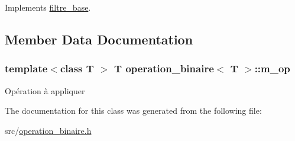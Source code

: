 Implements \hyperlink{classfiltre__base_ad06f5db1f851e5ad8655c9d8927cf347}{filtre\-\_\-base}.



\subsection{Member Data Documentation}
\hypertarget{classoperation__binaire_a7a8ee3b101f3fe8653fd62082e299051}{
\subsubsection[{m\-\_\-op}]{\setlength{\rightskip}{0pt plus 5cm}template$<$class T $>$ T {\bf operation\-\_\-binaire}$<$ T $>$\-::m\-\_\-op\hspace{0.3cm}{\ttfamily [private]}}}\label{classoperation__binaire_a7a8ee3b101f3fe8653fd62082e299051}
Opération à appliquer 

The documentation for this class was generated from the following file\-:\begin{DoxyCompactItemize}
\item 
src/\hyperlink{operation__binaire_8h}{operation\-\_\-binaire.\-h}\end{DoxyCompactItemize}
